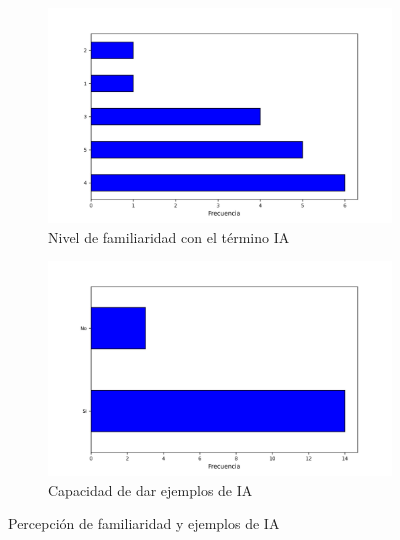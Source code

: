 \documentclass[12pt,a4paper]{article}
\begin{document}
\begin{figure}[h!]
    \centering
    \begin{subfigure}{0.45\linewidth}
        \centering
        \includegraphics[width=\linewidth]{resultados/3_Del 1 al 5, Qué tan familiarizado está con el término Inteligencia Artificial.jpg}
        \caption{Nivel de familiaridad con el término IA}
        \label{fig:f3}
    \end{subfigure}
    \hfill
    \begin{subfigure}{0.45\linewidth}
        \centering
        \includegraphics[width=\linewidth]{resultados/4_Puede nombrar algunos ejemplos de IA que encuentre en su vida diaria.jpg}
        \caption{Capacidad de dar ejemplos de IA}
        \label{fig:f4}
    \end{subfigure}
    \caption{Percepción de familiaridad y ejemplos de IA}
\end{figure}
\end{document}
